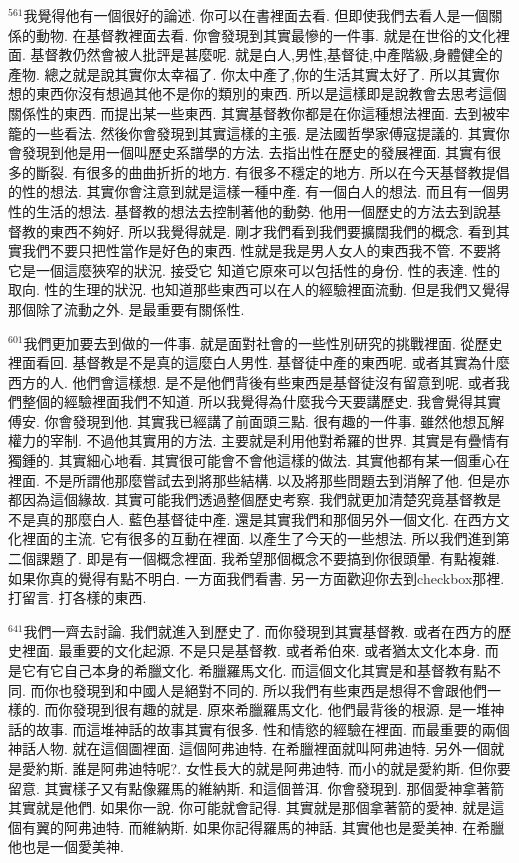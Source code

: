 \documentclass{book}
\begin{document}
$^{561}$我覺得他有一個很好的論述.
你可以在書裡面去看.
但即使我們去看人是一個關係的動物.
在基督教裡面去看.
你會發現到其實最慘的一件事.
就是在世俗的文化裡面.
基督教仍然會被人批評是甚麼呢.
就是白人,男性,基督徒,中產階級,身體健全的產物.
總之就是說其實你太幸福了.
你太中產了,你的生活其實太好了.
所以其實你想的東西你沒有想過其他不是你的類別的東西.
所以是這樣即是說教會去思考這個關係性的東西.
而提出某一些東西.
其實基督教你都是在你這種想法裡面.
去到被牢籠的一些看法.
然後你會發現到其實這樣的主張.
是法國哲學家傅寇提議的.
其實你會發現到他是用一個叫歷史系譜學的方法.
去指出性在歷史的發展裡面.
其實有很多的斷裂.
有很多的曲曲折折的地方.
有很多不穩定的地方.
所以在今天基督教提倡的性的想法.
其實你會注意到就是這樣一種中產.
有一個白人的想法.
而且有一個男性的生活的想法.
基督教的想法去控制著他的動勢.
他用一個歷史的方法去到說基督教的東西不夠好.
所以我覺得就是.
剛才我們看到我們要擴闊我們的概念.
看到其實我們不要只把性當作是好色的東西.
性就是我是男人女人的東西我不管.
不要將它是一個這麼狹窄的狀況.
接受它 知道它原來可以包括性的身份.
性的表達.
性的取向.
性的生理的狀況.
也知道那些東西可以在人的經驗裡面流動.
但是我們又覺得那個除了流動之外.
是最重要有關係性.

$^{601}$我們更加要去到做的一件事.
就是面對社會的一些性別研究的挑戰裡面.
從歷史裡面看回.
基督教是不是真的這麼白人男性.
基督徒中產的東西呢.
或者其實為什麼西方的人.
他們會這樣想.
是不是他們背後有些東西是基督徒沒有留意到呢.
或者我們整個的經驗裡面我們不知道.
所以我覺得為什麼我今天要講歷史.
我會覺得其實傅安.
你會發現到他.
其實我已經講了前面頭三點.
很有趣的一件事.
雖然他想瓦解權力的宰制.
不過他其實用的方法.
主要就是利用他對希羅的世界.
其實是有疊情有獨鍾的.
其實細心地看.
其實很可能會不會他這樣的做法.
其實他都有某一個重心在裡面.
不是所謂他那麼嘗試去到將那些結構.
以及將那些問題去到消解了他.
但是亦都因為這個緣故.
其實可能我們透過整個歷史考察.
我們就更加清楚究竟基督教是不是真的那麼白人.
藍色基督徒中產.
還是其實我們和那個另外一個文化.
在西方文化裡面的主流.
它有很多的互動在裡面.
以產生了今天的一些想法.
所以我們進到第二個課題了.
即是有一個概念裡面.
我希望那個概念不要搞到你很頭暈.
有點複雜.
如果你真的覺得有點不明白.
一方面我們看書.
另一方面歡迎你去到checkbox那裡.
打留言.
打各樣的東西.

$^{641}$我們一齊去討論.
我們就進入到歷史了.
而你發現到其實基督教.
或者在西方的歷史裡面.
最重要的文化起源.
不是只是基督教.
或者希伯來.
或者猶太文化本身.
而是它有它自己本身的希臘文化.
希臘羅馬文化.
而這個文化其實是和基督教有點不同.
而你也發現到和中國人是絕對不同的.
所以我們有些東西是想得不會跟他們一樣的.
而你發現到很有趣的就是.
原來希臘羅馬文化.
他們最背後的根源.
是一堆神話的故事.
而這堆神話的故事其實有很多.
性和情慾的經驗在裡面.
而最重要的兩個神話人物.
就在這個圖裡面.
這個阿弗迪特.
在希臘裡面就叫阿弗迪特.
另外一個就是愛約斯.
誰是阿弗迪特呢?.
女性長大的就是阿弗迪特.
而小的就是愛約斯.
但你要留意.
其實樣子又有點像羅馬的維納斯.
和這個普洱.
你會發現到.
那個愛神拿著箭其實就是他們.
如果你一說.
你可能就會記得.
其實就是那個拿著箭的愛神.
就是這個有翼的阿弗迪特.
而維納斯.
如果你記得羅馬的神話.
其實他也是愛美神.
在希臘他也是一個愛美神.
\end{document}
